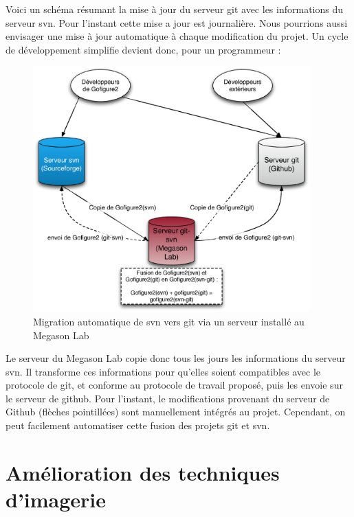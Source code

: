 Voici un schéma résumant la mise à jour du serveur git avec les informations du serveur svn.
Pour l'instant cette mise a jour est journalière.
Nous pourrions aussi envisager une mise à jour automatique à chaque modification du projet.
Un cycle de développement simplifie devient donc, pour un programmeur :
\begin{figure}[H]
\begin{center}
\leavevmode
\includegraphics[width=0.95\textwidth]{pictures/GitTransfert}
\end{center}
\caption{Migration automatique de svn vers git via un serveur installé au Megason Lab}
\label{fig:MigrationGit}
\end{figure}
Le serveur du Megason Lab copie donc tous les jours les informations du serveur svn.
Il transforme ces informations pour qu'elles soient compatibles avec le protocole de git,
et conforme au protocole de travail proposé, puis les envoie sur le serveur de github.
Pour l'instant, le modifications provenant du serveur de Github (flèches pointillées)
sont manuellement intégrés au projet. Cependant, on peut facilement automatiser cette fusion des projets git et svn.






\section{Amélioration des techniques d'imagerie}

